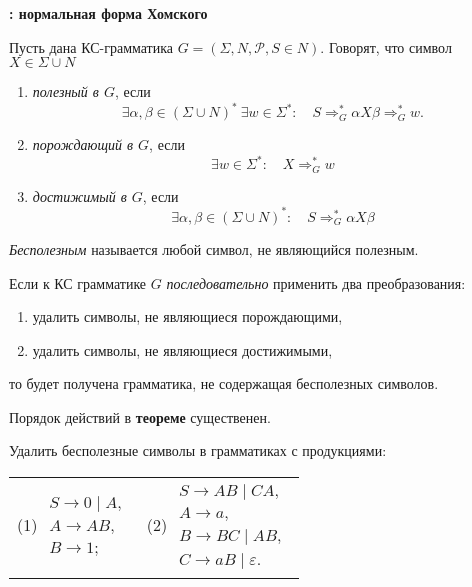 \begin{center}
{\bfseries\Large \textsc{\Llabel{} \Lnum}: нормальная форма Хомского}
\end{center}

\begin{Def}Пусть дана КС-грамматика $G=(\Sigma, N, \mathcal P, S \in N)$.
Говорят, что символ $X \in \Sigma \cup N$ 
\begin{enumerate}
    \item \emph{полезный в $G$}, если
    $$
        \exists \alpha, \beta \in (\Sigma \cup N)^{\ast} \:
        \exists w \in \Sigma^* \colon \quad
        S \Rightarrow^{\ast}_G \alpha X \beta \Rightarrow^{\ast}_G w. 
    $$
    \item \emph{порождающий в $G$}, если
    $$
        \exists w \in \Sigma^* \colon \quad X \Rightarrow^{\ast}_G w 
    $$
    \item  \emph{достижимый в $G$}, если
    $$
        \exists \alpha, \beta \in (\Sigma \cup N)^{\ast} \colon \quad 
        S \Rightarrow^{\ast}_G \alpha X \beta
    $$
\end{enumerate}
\emph{Бесполезным} называется любой символ, не являющийся полезным.
\end{Def}


\begin{Thm} 
Если к КС грамматике $G$ \emph{последовательно} применить два преобразования:
\begin{enumerate}
  \item удалить символы, не являющиеся порождающими,
  \item удалить символы, не являющиеся достижимыми,
\end{enumerate}
то будет получена грамматика, не содержащая бесполезных символов.
\end{Thm}

\begin{Remark}
Порядок действий в \textbf{теореме} существенен.
\end{Remark}

\begin{Task} 
Удалить бесполезные символы в грамматиках с продукциями:

\begin{tabular}{cc} 
    (1) $
        \begin{array}{l}
            S \to 0 \mid A,\\
            A \to AB,\\
            B \to 1;
        \end{array}
    $
        &
    (2) $
        \begin{array}{l}
            S \to AB \mid CA,\\
            A \to a,\\
            B \to BC \mid AB,\\
            C \to aB \mid \varepsilon.
        \end{array} 
    $
\end{tabular}
\end{Task}

